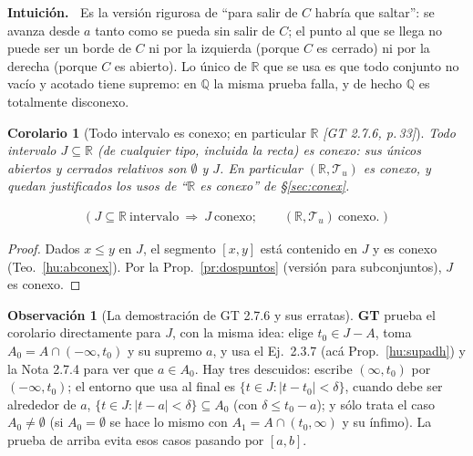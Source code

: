 \documentclass[11pt,a4paper]{article}
\newenvironment{intuicion}{\begin{cajaint}\small\textbf{Intuición.\ }}{\end{cajaint}}
\newcommand{\lgc}[1]{\par\vspace{-3pt}\begin{gather*}\big(\;#1\;\big)\end{gather*}\vspace{-6pt}}
\theoremstyle{definition}
\newtheorem{observacion}[definicion]{Observación}
\theoremstyle{plain}
\newtheorem{corolario}[definicion]{Corolario}
\newcommand{\fnt}[1]{{\normalfont\small\itshape\color{gray!150!black}[#1]}}
\newcommand{\R}{\mathbb{R}}
\newcommand{\Q}{\mathbb{Q}}
\newcommand{\tp}{\mathcal{T}}
\begin{document}
\begin{intuicion}
Es la versión rigurosa de ``para salir de $C$ habría que saltar'': se avanza desde $a$ tanto como se pueda sin salir de $C$; el punto al que se llega no puede ser un borde de $C$ ni por la izquierda (porque $C$ es cerrado) ni por la derecha (porque $C$ es abierto). Lo único de $\R$ que se usa es que todo conjunto no vacío y acotado tiene supremo: en $\Q$ la misma prueba falla, y de hecho $\Q$ es totalmente disconexo.
\end{intuicion}

\begin{corolario}[Todo intervalo es conexo; en particular $\R$ \fnt{GT 2.7.6, p.\,33}]\label{hu:intconex}
Todo intervalo $J\subseteq\R$ (de cualquier tipo, incluida la recta) es conexo: sus únicos abiertos y cerrados relativos son $\emptyset$ y $J$. En particular $(\R,\tp_u)$ es conexo, y quedan justificados los usos de ``$\R$ es conexo'' de \S\ref{sec:conex}.
\lgc{J\subseteq\R\ \text{intervalo}\ \Rightarrow\ J\ \text{conexo};\qquad (\R,\tp_u)\ \text{conexo}.}
\end{corolario}

\begin{proof}
Dados $x\le y$ en $J$, el segmento $[x,y]$ está contenido en $J$ y es conexo (Teo.~\ref{hu:abconex}). Por la Prop.~\ref{pr:dospuntos} (versión para subconjuntos), $J$ es conexo.
\end{proof}

\begin{observacion}[La demostración de GT 2.7.6 y sus erratas]
\textbf{GT} prueba el corolario directamente para $J$, con la misma idea: elige $t_0\in J-A$, toma $A_0=A\cap(-\infty,t_0)$ y su supremo $a$, y usa el Ej.\ 2.3.7 (acá Prop.~\ref{hu:supadh}) y la Nota 2.7.4 para ver que $a\in A_0$. Hay tres descuidos: escribe $(\infty,t_0)$ por $(-\infty,t_0)$; el entorno que usa al final es $\{t\in J: |t-t_0|<\delta\}$, cuando debe ser alrededor de $a$, $\{t\in J:|t-a|<\delta\}\subseteq A_0$ (con $\delta\le t_0-a$); y sólo trata el caso $A_0\ne\emptyset$ (si $A_0=\emptyset$ se hace lo mismo con $A_1=A\cap(t_0,\infty)$ y su ínfimo). La prueba de arriba evita esos casos pasando por $[a,b]$.
\end{observacion}
\end{document}
